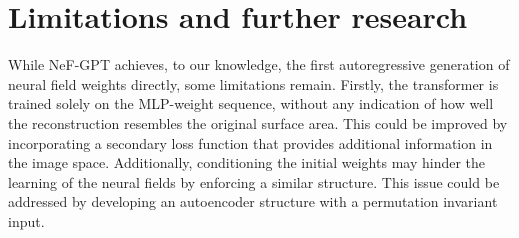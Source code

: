 \section{Limitations and further research}

While NeF-GPT achieves, to our knowledge, the first autoregressive generation of neural field weights directly, some limitations remain. Firstly, the transformer is trained solely on the MLP-weight sequence, without any indication of how well the reconstruction resembles the original surface area. This could be improved by incorporating a secondary loss function that provides additional information in the image space. Additionally, conditioning the initial weights may hinder the learning of the neural fields by enforcing a similar structure. This issue could be addressed by developing an autoencoder structure with a permutation invariant input.